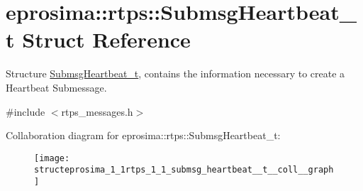 \hypertarget{structeprosima_1_1rtps_1_1_submsg_heartbeat__t}{\section{eprosima\-:\-:rtps\-:\-:\-Submsg\-Heartbeat\-\_\-t \-Struct \-Reference}
\label{structeprosima_1_1rtps_1_1_submsg_heartbeat__t}
}


\-Structure \hyperlink{structeprosima_1_1rtps_1_1_submsg_heartbeat__t}{\-Submsg\-Heartbeat\-\_\-t}, contains the information necessary to create a \-Heartbeat \-Submessage.  




{\ttfamily \#include $<$rtps\-\_\-messages.\-h$>$}



\-Collaboration diagram for eprosima\-:\-:rtps\-:\-:\-Submsg\-Heartbeat\-\_\-t\-:\nopagebreak
\begin{figure}[H]
\begin{center}
\leavevmode
\texttt{[image: structeprosima\_1\_1rtps\_1\_1\_submsg\_heartbeat\_\_t\_\_coll\_\_graph]}
\end{center}
\end{figure}
